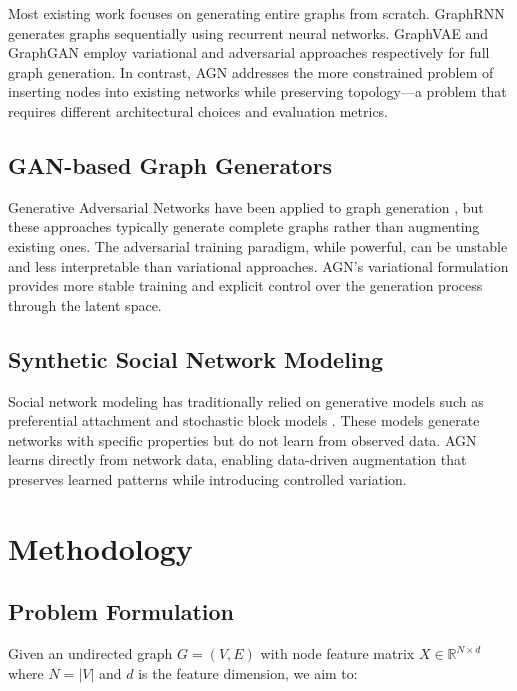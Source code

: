 \documentclass[12pt]{article}
\begin{document}
Most existing work focuses on generating entire graphs from scratch. GraphRNN \cite{you2018graphrnn} generates graphs sequentially using recurrent neural networks. GraphVAE \cite{simonovsky2018graphvae} and GraphGAN \cite{wang2018graphgan} employ variational and adversarial approaches respectively for full graph generation. In contrast, AGN addresses the more constrained problem of inserting nodes into existing networks while preserving topology---a problem that requires different architectural choices and evaluation metrics.

\subsection{GAN-based Graph Generators}

Generative Adversarial Networks have been applied to graph generation \cite{wang2018graphgan, bojchevski2018netgan}, but these approaches typically generate complete graphs rather than augmenting existing ones. The adversarial training paradigm, while powerful, can be unstable and less interpretable than variational approaches. AGN's variational formulation provides more stable training and explicit control over the generation process through the latent space.

\subsection{Synthetic Social Network Modeling}

Social network modeling has traditionally relied on generative models such as preferential attachment \cite{barabasi1999emergence} and stochastic block models \cite{holland1983stochastic}. These models generate networks with specific properties but do not learn from observed data. AGN learns directly from network data, enabling data-driven augmentation that preserves learned patterns while introducing controlled variation.

\section{Methodology}

\subsection{Problem Formulation}

Given an undirected graph $G = (V, E)$ with node feature matrix $X \in \mathbb{R}^{N \times d}$ where $N = |V|$ and $d$ is the feature dimension, we aim to:
\end{document}
